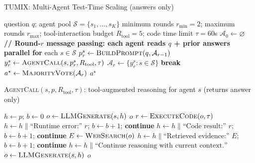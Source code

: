 \begin{algorithm}[ht]
\caption{TUMIX: Multi-Agent Test-Time Scaling (answers only)}
\label{alg:tumix}
\begin{algorithmic}[1]
\Require question $q$; agent pool $\mathcal{S}=\{s_1,\dots,s_K\}$ 
\Require minimum rounds $r_{\min}=2$; maximum rounds $r_{\max}$; tool-interaction budget $R_{\text{tool}}=5$; code time limit $\tau=60$s
\State $\mathcal{A}_0 \gets \varnothing$ 
  \Statex \textbf{// Round-$r$ message passing: each agent reads $q$ + prior answers}
  \State \textbf{parallel for} each $s\in\mathcal{S}$ \label{line:parallel}
    \State $p_r^s \gets \textsc{BuildPrompt}(q,\mathcal{A}_{r-1})$ 
    \State $y_r^s \gets \textsc{AgentCall}(s,p_r^s,R_{\text{tool}},\tau)$ 
  \State $\mathcal{A}_r \gets \{y_r^s : s\in\mathcal{S}\}$
   \label{line:terminate}
     \State \textbf{break}
  \EndIf
\EndFor
\State $a^\star \gets \textsc{MajorityVote}(\mathcal{A}_r)$
\State \Return $a^\star$
\end{algorithmic}
\end{algorithm}

\begin{algorithm}[!ht]
\caption{\textsc{AgentCall}$(s,p,R_{\text{tool}},\tau)$: tool-augmented reasoning for agent $s$ (returns answer only)}
\label{alg:agentcall}
\begin{algorithmic}[1]
\State $h \gets p$; $b \gets 0$ 
   \State $o \gets \textsc{LLMGenerate}(s,h)$ 
      \State \Return $o$
      \State $r \gets \textsc{ExecuteCode}(o,\tau)$ 
         \State $h \gets h \parallel \text{``Runtime error:'' } r$; $b \gets b+1$; \textbf{continue}
      \Else
         \State $h \gets h \parallel \text{``Code result:'' } r$; $b \gets b+1$; \textbf{continue}
      \EndIf
      \State $E \gets \textsc{WebSearch}(o)$ 
      \State $h \gets h \parallel \text{``Retrieved evidence:'' } E$; $b \gets b+1$; \textbf{continue}
   \Else
      \State $h \gets h \parallel \text{``Continue reasoning with current context.''}$ 
   \EndIf
\EndWhile
\State $o \gets \textsc{LLMGenerate}(s,h)$ 
\State \Return $o$
\end{algorithmic}
\end{algorithm}

